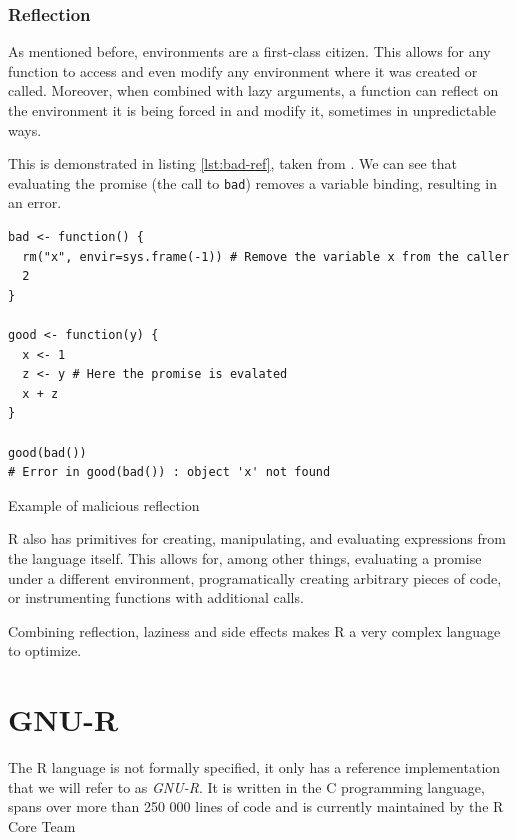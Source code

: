 \subsubsection*{Reflection}

As mentioned before, environments are a first-class citizen. This allows for any function to access and even modify any environment where it was created or called. Moreover, when combined with lazy arguments, a function can reflect on the environment it is being forced in and modify it, sometimes in unpredictable ways.

This is demonstrated in listing \ref{lst:bad-ref}, taken from \cite{r-melts-brains}. We can see that evaluating the promise (the call to \texttt{bad}) removes a variable binding, resulting in an error.

\begin{listing}
	\centering
	\begin{verbatim}
bad <- function() {
  rm("x", envir=sys.frame(-1)) # Remove the variable x from the caller
  2
}

good <- function(y) {
  x <- 1
  z <- y # Here the promise is evalated
  x + z
}

good(bad())
# Error in good(bad()) : object 'x' not found
  \end{verbatim}
	\caption{Example of malicious reflection\cite{r-melts-brains}}\label{lst:bad-ref}
\end{listing}

R also has primitives for creating, manipulating, and evaluating expre\-ssions from the language itself. This allows for, among other things, evaluating a promise under a different environment, programatically creating arbitrary pieces of code, or instrumenting functions with additional calls.

Combining reflection, laziness and side effects makes R a very complex language to optimize.

\newpage
\section{GNU-R}

The R language is not formally specified, it only has a reference implementation that we will refer to as \textit{GNU-R}. It is written in the C programming language, spans over more than {250 000} lines of code and is currently maintained by the R Core Team

